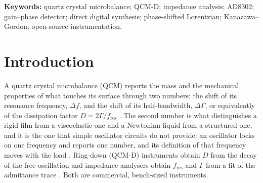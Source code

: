 \documentclass[11pt,a4paper]{article}
\begin{document}
\begin{abstract}
Newtonian ratio of 1.20--1.41 (conductance maximum) against 1.01--1.16
(fit) on overtones 3--9 in all four liquids and a water frequency shift
of +20 to +36 \% against +6 to +13 \% over the theory; the fit also
collapses the overtone-normalised frequency shifts onto the √n law of
the theory to 2.4--2.9 \% (6--7 \% with the maximum); concentration
steps of 2.5 \% w/v are resolved at more than 13 standard deviations of
the replica scatter, with a noise-equivalent resolution of 0.1--0.2 \%
w/v, while an unexplained offset of the 5 \% plateau (10--18 Hz,
0.5--1.7 \% w/v equivalent) limits the accuracy. The rotation angle of
the second board agrees with the first within 1--3° on four of five
overtones but is not monotonic in frequency, and its fundamental follows
the theory (bandwidth +4 to +7 \%). A forward model with a board phase
acting on the measured transfer function shows that the
rotated-Lorentzian correction is exact only when the motional resistance
is large compared with the divider resistor, which holds in liquid, and
quantifies the residual. All raw data and analysis scripts are released.
\end{abstract}
\noindent\textbf{Keywords:} quartz crystal microbalance; QCM-D; impedance analysis; AD8302; gain--phase detector; direct digital synthesis; phase-shifted Lorentzian; Kanazawa--Gordon; open-source instrumentation.

\hypertarget{introduction}{%
\section{Introduction}\label{introduction}}

A quartz crystal microbalance (QCM) reports the mass and the mechanical
properties of what touches its surface through two numbers: the shift of
its resonance frequency, \(\Delta f\), and the shift of its
half-bandwidth, \(\Delta\Gamma\), or equivalently of the dissipation
factor \(D = 2\Gamma/f_\mathrm{res}\)
\citep{Sauerbrey1959, KanazawaGordon1985AC, Johannsmann2021}. The second
number is what distinguishes a rigid film from a viscoelastic one and a
Newtonian liquid from a structured one, and it is the one that simple
oscillator circuits do not provide: an oscillator locks on one frequency
and reports one number, and its definition of that frequency moves with
the load \citep{Arnau2008, RodriguezPardo2004}. Ring-down (QCM-D)
instruments obtain \(D\) from the decay of the free oscillation
\citep{Rodahl1995} and impedance analysers obtain \(f_\mathrm{res}\) and
\(\Gamma\) from a fit of the admittance trace
\citep{Martin1991, Johannsmann2021, JohannsmannReviakine2024}. Both are
commercial, bench-sized instruments.
\end{document}
